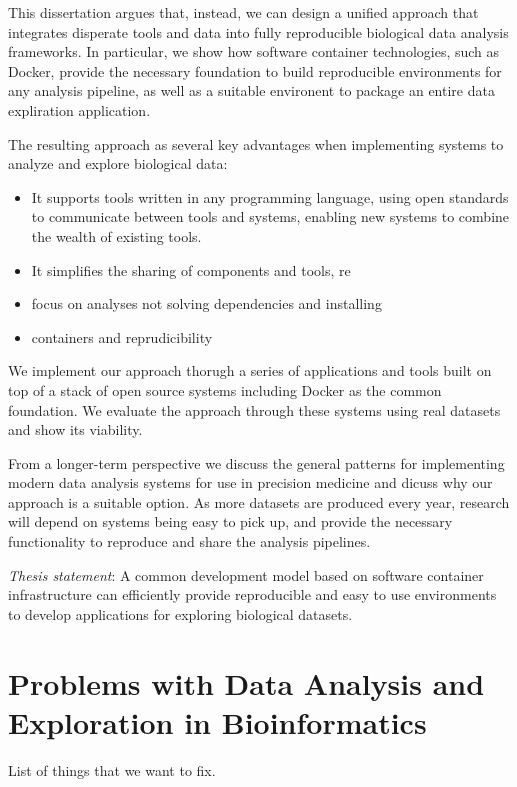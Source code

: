 This dissertation argues that, instead, we can design a unified approach that
integrates disperate tools and data into fully reproducible biological data
analysis frameworks.  In particular, we show how software container
technologies, such as Docker, provide the necessary foundation to build
reproducible environments for any analysis pipeline, as well as a suitable
environent to package an entire data expliration application. 

The resulting approach as several key advantages when implementing systems to
analyze and explore biological data: 
\begin{itemize} 
    \item It supports tools written in any programming language, using open
        standards to communicate between tools and systems, enabling new systems
        to combine the wealth of existing tools. 
    \item It simplifies the sharing of components and tools, re
    \item focus on analyses not solving dependencies and installing
    \item containers and reprudicibility
\end{itemize} 

We implement our approach thorugh a series of applications and tools built on
top of a stack of open source systems including Docker as the common foundation.
We evaluate the approach through these systems using real datasets and show its
viability. 

From a longer-term perspective we discuss the general patterns for implementing
modern data analysis systems for use in precision medicine and dicuss why our
approach is a suitable option. As more datasets are produced every year,
research will depend on systems being easy to pick up, and provide the necessary
functionality to reproduce and share the analysis pipelines. 

\emph{Thesis statement}:
A common development model based on software container infrastructure can
efficiently provide reproducible and easy to use environments to develop
applications for exploring biological datasets. 

\section{Problems with Data Analysis and Exploration in Bioinformatics} 
    List of things that we want to fix. 

